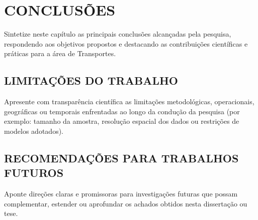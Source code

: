 \chapter{CONCLUSÕES}
\label{conclusao}
\label{capitulo5}

Sintetize neste capítulo as principais conclusões alcançadas pela pesquisa, respondendo aos objetivos propostos e destacando as contribuições científicas e práticas para a área de Transportes.

\section{LIMITAÇÕES DO TRABALHO}
\label{sec:limitacoes}

Apresente com transparência científica as limitações metodológicas, operacionais, geográficas ou temporais enfrentadas ao longo da condução da pesquisa (por exemplo: tamanho da amostra, resolução espacial dos dados ou restrições de modelos adotados).

\section{RECOMENDAÇÕES PARA TRABALHOS FUTUROS}
\label{sec:trabalhos_futuros}

Aponte direções claras e promissoras para investigações futuras que possam complementar, estender ou aprofundar os achados obtidos nesta dissertação ou tese.
